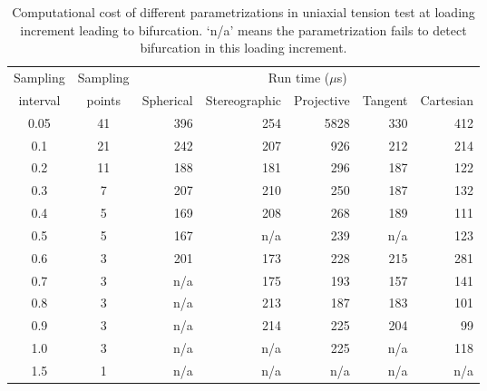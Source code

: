 \documentclass[12pt]{article}
\numberwithin{equation}{section}
\begin{document}
\begin{table}[H]
  \begin{center}
    \begin{tabular}{c c | r r r r r}
      \toprule
      Sampling   & Sampling &   \multicolumn{5}{c}{Run time ($\mu$s)}	\\
      interval     & points     &  Spherical    &   Stereographic  &   Projective  &   Tangent   & Cartesian  \\
      \midrule
      0.05      &      41     &      396     &    254       &       5828       &       330        &      412           \\
      0.1        &      21     &      242     &    207       &       926         &       212        &      214           \\
      0.2        &      11     &      188     &    181       &       296         &       187        &      122           \\
      0.3        &      7       &      207     &    210       &       250         &       187        &      132           \\
      0.4        &      5       &      169     &    208       &       268         &       189        &      111           \\
      0.5        &      5       &	  167     &    n/a        &       239         &       n/a         &      123           \\
      0.6        &      3       &	  201     &    173       &       228         &       215        &      281           \\
      0.7        &      3       &	  n/a      &    175 	     &       193         &       157        &      141           \\
      0.8        &      3       &      n/a      &    213       &       187         &       183        &       101          \\
      0.9        &      3       &	  n/a      &    214       &       225         &       204        &       99            \\
      1.0        &      3       &      n/a      &    n/a	     &       225         &       n/a         &       118          \\
      1.5        &      1       &	  n/a      &    n/a	     &       n/a          &       n/a         &       n/a           \\
      \bottomrule
    \end{tabular}
    \caption{Computational cost of different parametrizations in
    uniaxial tension test at loading increment leading to bifurcation.
    `n/a' means the parametrization fails to detect bifurcation in
    this loading increment.}
    \label{tab:aniso_uniaxial_runtime}
  \end{center}
\end{table}
\end{document}
